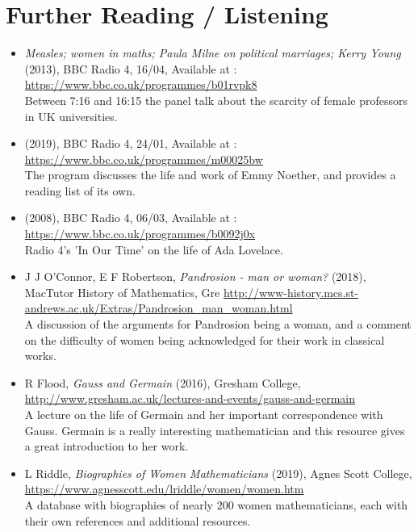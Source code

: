 \documentclass{article}
\begin{document}
\section*{Further Reading / Listening}

\begin{itemize}
    \item \textit{Measles; women in maths; Paula Milne on political marriages; Kerry Young} (2013), BBC Radio 4, 16/04, Available at : \url{https://www.bbc.co.uk/programmes/b01rvpk8} \\
    Between 7:16 and 16:15 the panel talk about the scarcity of female professors in UK universities. 
    
    
    \item {} (2019), BBC Radio 4, 24/01, Available at : \url{https://www.bbc.co.uk/programmes/m00025bw} \\
    The program discusses the life and work of Emmy Noether, and provides a reading list of its own. 
    
    
    \item {} (2008), BBC Radio 4, 06/03, Available at : \url{https://www.bbc.co.uk/programmes/b0092j0x} \\
    Radio 4's 'In Our Time' on the life of Ada Lovelace. 
    
    
    \item J J O'Connor, E F Robertson, \textit{Pandrosion - man or woman?} (2018), MacTutor History of Mathematics, Gre \url{http://www-history.mcs.st-andrews.ac.uk/Extras/Pandrosion_man_woman.html} \\
    A discussion of the arguments for Pandrosion being a woman, and a comment on the difficulty of women being acknowledged for their work in classical works. 
    
    
    \item R Flood, \textit{Gauss and Germain} (2016), Gresham College, \\
    \url{http://www.gresham.ac.uk/lectures-and-events/gauss-and-germain} \\
    A lecture on the life of Germain and her important correspondence with Gauss. Germain is a really interesting mathematician and this resource gives a great introduction to her work. 
    
    
    \item L Riddle, \textit{Biographies of Women Mathematicians} (2019), Agnes Scott College, \url{https://www.agnesscott.edu/lriddle/women/women.htm} \\
    A database with biographies of nearly 200 women mathematicians, each with their own references and additional resources.
    

\end{itemize}
\end{document}
